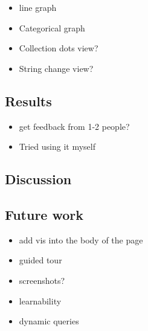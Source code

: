 \documentclass{sigchi}
\providecommand{\tightlist}{%
  \setlength{\itemsep}{0pt}\setlength{\parskip}{0pt}}
\begin{document}
\begin{itemize}
\tightlist
\item
  line graph
\item
  Categorical graph
\item
  Collection dots view?
\item
  String change view?
\end{itemize}

\hypertarget{results}{%
\subsection{Results}\label{results}}

\begin{itemize}
\tightlist
\item
  get feedback from 1-2 people?
\item
  Tried using it myself
\end{itemize}

\hypertarget{discussion}{%
\subsection{Discussion}\label{discussion}}

\hypertarget{future-work}{%
\subsection{Future work}\label{future-work}}

\begin{itemize}
\tightlist
\item
  add vis into the body of the page
\item
  guided tour
\item
  screenshots?
\item
  learnability
\item
  dynamic queries
\end{itemize}

%
%
%
%
%
\balance{}

% 
% 

\printbibliography
\end{document}
